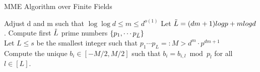\begin{frame}{MME Algorithm over Finite Fields}
    \tiny{\begin{algorithm}[H]
    \SetAlgoLined
        Adjust d and m such that $\log \log d \le m \le d^{o(1)}$
        Let $\Tilde{L} = (dm + 1) log p + m log d$. Compute first $\Tilde{L}$ prime numbers $\{p_1, \cdots p_{\Tilde{L}}\}$ \\
        Let $L\leq s$ be the smallest integer such that $p_1\cdots p_L =: M > d^m \cdot p^{dm+1}$ \\
        {
            Compute the unique $b_i\in [-M/2, M/2]$ such that $b_i = b_{i,l} \bmod{p_l}$ for all $l\in [L]$.
        }
        \;
    \caption{\textsc{MME-Finite-Field}}
\end{algorithm}}
\end{frame}